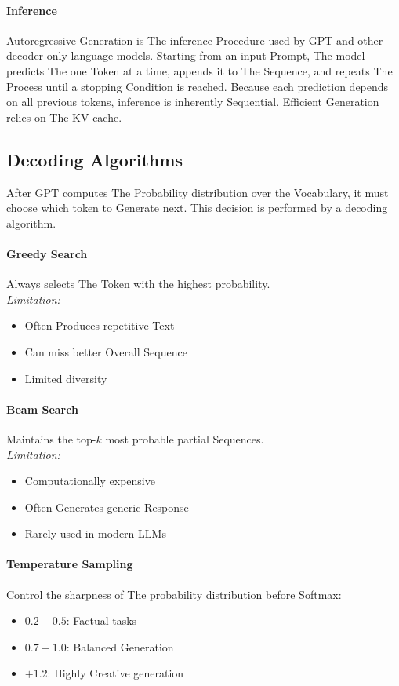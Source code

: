 \paragraph{Inference}
Autoregressive Generation is The inference Procedure used by GPT and other decoder-only language models. Starting from an input Prompt, The model predicts The one Token at a time, appends it to The Sequence, and repeats The Process until a stopping Condition is reached. Because each prediction depends on all previous tokens, inference is inherently Sequential. Efficient Generation relies on The KV cache.

\subsection{Decoding Algorithms}

After GPT computes The Probability distribution over the Vocabulary, it must choose which token to Generate next. This decision is performed by a decoding algorithm.

\paragraph{Greedy Search}
Always selects The Token with the highest probability. \\
\textit{Limitation:}
\begin{itemize}
    \item Often Produces repetitive Text
    \item Can miss better Overall Sequence
    \item Limited diversity
\end{itemize}

\paragraph{Beam Search}
Maintains the top-$k$ most probable partial Sequences. \\
\textit{Limitation:}
\begin{itemize}
    \item Computationally expensive
    \item Often Generates generic Response
    \item Rarely used in modern LLMs
\end{itemize}

\paragraph{Temperature Sampling}
Control the sharpness of The probability distribution before Softmax:
\begin{itemize}
    \item $0.2 - 0.5$: Factual tasks
    \item $0.7 - 1.0$: Balanced Generation
    \item $+1.2$: Highly Creative generation
\end{itemize}

